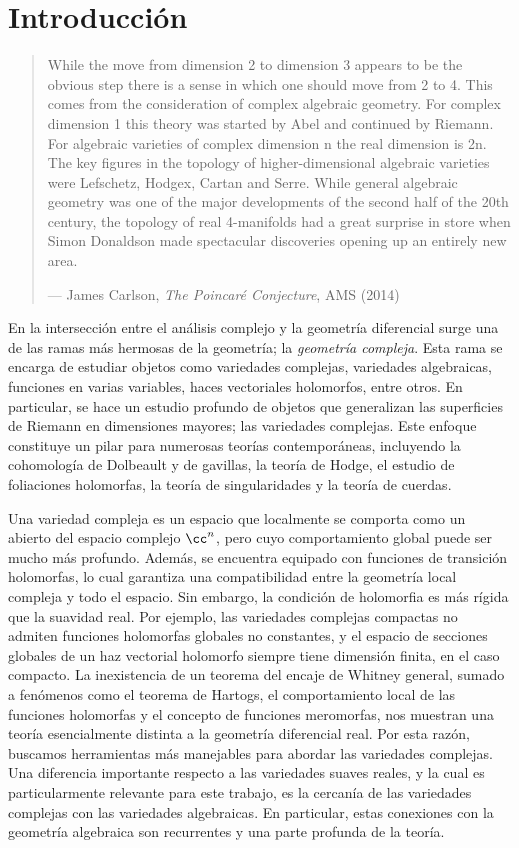 \chapter*{Introducción}


\begin{quote}
	While the move from dimension 2 to dimension 3 appears to be the obvious step there is a sense in which one should move from 2 to 4. This comes from the consideration of complex algebraic geometry. For complex dimension 1 this theory was started by Abel and continued by Riemann. For algebraic varieties of complex dimension n the real dimension is 2n. The key figures in the topology of higher-dimensional algebraic varieties were Lefschetz, Hodgex, Cartan and Serre. While general algebraic geometry was one of the major developments of the second half of the 20th century, the topology of real 4-manifolds had a great surprise in store when Simon Donaldson made spectacular discoveries opening up an entirely new area.
	
	\hfill --- James Carlson, \textit{The Poincaré Conjecture}, AMS (2014)
\end{quote}


En la intersección entre el análisis complejo y la geometría diferencial surge una de las ramas más hermosas de la geometría; la \textit{geometría compleja}. Esta rama se encarga de estudiar objetos como variedades complejas, variedades algebraicas, funciones en varias variables, haces vectoriales holomorfos, entre otros. En particular, se hace un estudio profundo de objetos que generalizan las superficies de Riemann en dimensiones mayores; las variedades complejas. Este enfoque constituye un pilar para numerosas teorías contemporáneas, incluyendo la cohomología de Dolbeault y de gavillas, la teoría de Hodge, el estudio de foliaciones holomorfas, la teoría de singularidades y la teoría de cuerdas.

Una variedad compleja es un espacio que localmente se comporta como un abierto del espacio complejo $\cc^n$, pero cuyo comportamiento global puede ser mucho más profundo. Además, se encuentra equipado con funciones de transición holomorfas, lo cual garantiza una compatibilidad entre la geometría local compleja y todo el espacio. Sin embargo, la condición de holomorfia es más rígida que la suavidad real. Por ejemplo, las variedades complejas compactas no admiten funciones holomorfas globales no constantes, y el espacio de secciones globales de un haz vectorial holomorfo siempre tiene dimensión finita, en el caso compacto. La inexistencia de un teorema del encaje de Whitney general, sumado a fenómenos como el teorema de Hartogs, el comportamiento local de las funciones holomorfas y el concepto de funciones meromorfas, nos muestran una teoría esencialmente distinta a la geometría diferencial real. Por esta razón, buscamos herramientas más manejables para abordar las variedades complejas. Una diferencia importante respecto a las variedades suaves reales, y la cual es particularmente relevante para este trabajo, es la cercanía de las variedades complejas con las variedades algebraicas. En particular, estas conexiones con la geometría algebraica son recurrentes y una parte profunda de la teoría.

